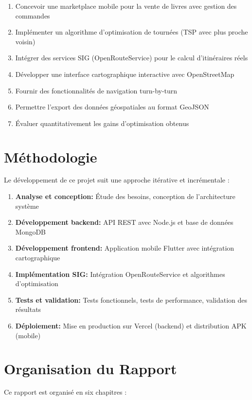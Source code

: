\documentclass[12pt,a4paper]{report}
\begin{document}
\begin{enumerate}
    \item Concevoir une marketplace mobile pour la vente de livres avec gestion des commandes
    \item Implémenter un algorithme d'optimisation de tournées (TSP avec plus proche voisin)
    \item Intégrer des services SIG (OpenRouteService) pour le calcul d'itinéraires réels
    \item Développer une interface cartographique interactive avec OpenStreetMap
    \item Fournir des fonctionnalités de navigation turn-by-turn
    \item Permettre l'export des données géospatiales au format GeoJSON
    \item Évaluer quantitativement les gains d'optimisation obtenus
\end{enumerate}

\section{Méthodologie}

Le développement de ce projet suit une approche itérative et incrémentale :

\begin{enumerate}
    \item \textbf{Analyse et conception:} Étude des besoins, conception de l'architecture système
    \item \textbf{Développement backend:} API REST avec Node.js et base de données MongoDB
    \item \textbf{Développement frontend:} Application mobile Flutter avec intégration cartographique
    \item \textbf{Implémentation SIG:} Intégration OpenRouteService et algorithmes d'optimisation
    \item \textbf{Tests et validation:} Tests fonctionnels, tests de performance, validation des résultats
    \item \textbf{Déploiement:} Mise en production sur Vercel (backend) et distribution APK (mobile)
\end{enumerate}

\section{Organisation du Rapport}

Ce rapport est organisé en six chapitres :
\end{document}
